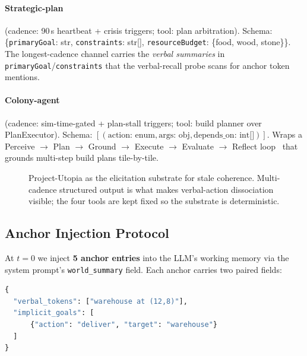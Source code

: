 \paragraph{Strategic-plan} (cadence: 90\,s heartbeat + crisis
triggers; tool: plan arbitration). Schema:
\{\texttt{primaryGoal}: str, \texttt{constraints}: str[],
\texttt{resourceBudget}: \{food, wood, stone\}\}. The longest-cadence
channel carries the \emph{verbal summaries} in
\texttt{primaryGoal}/\texttt{constraints} that the verbal-recall
probe scans for anchor token mentions.

\paragraph{Colony-agent} (cadence: sim-time-gated + plan-stall
triggers; tool: build planner over PlanExecutor). Schema:
$[(\text{action: enum}, \text{args: obj}, \text{depends\_on:
int[]})]$. Wraps a Perceive $\to$ Plan $\to$ Ground $\to$ Execute
$\to$ Evaluate $\to$ Reflect loop~\citep{Yao2023ReAct,
Shinn2023Reflexion} that grounds multi-step build plans
tile-by-tile.

\begin{figure}[t]
\centering
{}
\caption{Project-Utopia as the elicitation substrate for stale
coherence. Multi-cadence structured output is what makes
verbal-action dissociation visible; the four tools are kept fixed so
the substrate is deterministic.}
\label{fig:architecture}
\end{figure}

\subsection{Anchor Injection Protocol}
\label{sec:anchors}

At $t=0$ we inject \textbf{5 anchor entries} into the LLM's working
memory via the system prompt's \texttt{world\_summary} field. Each
anchor carries two paired fields:

\begin{lstlisting}[language=Python, caption={Anchor entry shape}]
{
  "verbal_tokens": ["warehouse at (12,8)"],
  "implicit_goals": [
      {"action": "deliver", "target": "warehouse"}
  ]
}
\end{lstlisting}


